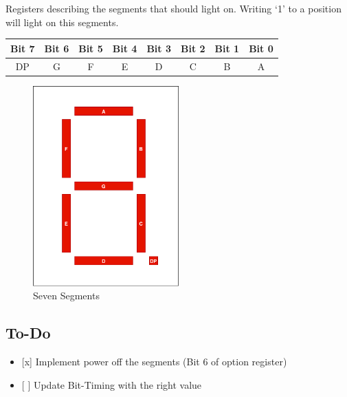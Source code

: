 Registers describing the segments that should light on. Writing `1' to a
position will light on this segments.

\begin{longtable}[c]{@{}cccccccc@{}}
\toprule
Bit 7 & Bit 6 & Bit 5 & Bit 4 & Bit 3 & Bit 2 & Bit 1 & Bit
0\tabularnewline
\midrule
\endhead
DP & G & F & E & D & C & B & A\tabularnewline
\bottomrule
\end{longtable}

\begin{figure}[htbp]
\centering
\includegraphics[width=0.50000\textwidth]{documents/images/seven_segments.png}
\caption{Seven Segments\label{command}}
\end{figure}

\subsection{To-Do}\label{to-do}

\begin{itemize}
\tightlist
\item
  {[}x{]} Implement power off the segments (Bit 6 of option register)
\item
  {[} {]} Update Bit-Timing with the right value
\end{itemize}
